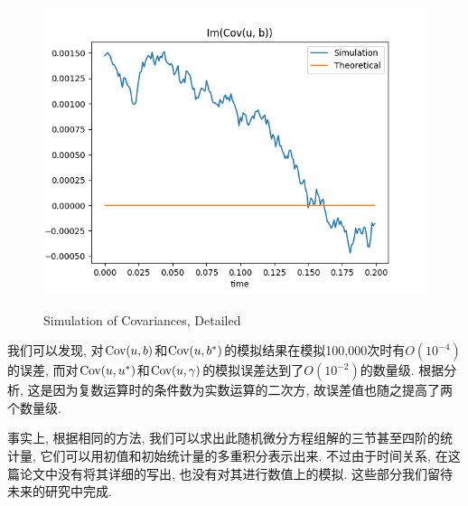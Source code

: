 \documentclass[notitlepage,cs4size,punct,oneside]{ctexrep}
\numberwithin{equation}{section}
\theoremstyle{mystyle}
\begin{document}
\begin{figure}[!ht]
{  \includegraphics[width = .2\textwidth]{NumericalSimulation/res/CovubIm.png}
}\hfill
{}\hfill
{}
\caption{Simulation of Covariances, Detailed}
\label{Simulation of Covariances}
\end{figure}

我们可以发现, 对$\text{Cov}(u, b)$和$\text{Cov}(u, b^*)$的模拟结果在模拟100,000次时有$O(10^{-4})$的误差, 而对$\text{Cov}(u, u^*)$和$\text{Cov}(u, \gamma)$的模拟误差达到了$O(10^{-2})$的数量级. 根据分析\cite{golub2012matrix}, 这是因为复数运算时的条件数为实数运算的二次方, 故误差值也随之提高了两个数量级.

事实上, 根据相同的方法, 我们可以求出此随机微分方程组解的三节甚至四阶的统计量, 它们可以用初值和初始统计量的多重积分表示出来. 不过由于时间关系, 在这篇论文中没有将其详细的写出, 也没有对其进行数值上的模拟. 这些部分我们留待未来的研究中完成.


\end{document}
